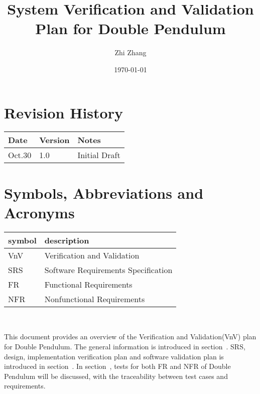 \documentclass[12pt, titlepage]{article}
\begin{document}
\title{System Verification and Validation Plan for Double Pendulum} 
\author{Zhi Zhang}
\date{\today}
	
\maketitle


\section{Revision History}

\begin{tabularx}{\textwidth}{p{3cm}p{2cm}X}
\toprule {\bf Date} & {\bf Version} & {\bf Notes}\\
\midrule
Oct.30 & 1.0 & Initial Draft\\

\bottomrule
\end{tabularx}

\newpage

\tableofcontents

\listoftables

\listoffigures

\newpage

\section{Symbols, Abbreviations and Acronyms}

\renewcommand{\arraystretch}{1.2}
\begin{tabular}{l l} 
  \toprule		
  \textbf{symbol} & \textbf{description}\\
  \midrule 
  VnV & Verification and Validation\\
  SRS & Software Requirements Specification\\
  FR & Functional Requirements\\
  NFR & Nonfunctional Requirements\\
  \bottomrule
\end{tabular}\\

\newpage


This document provides an overview of the Verification and Validation(VnV) plan for Double Pendulum. The general information is introduced in section~. SRS, design, implementation verification plan and software validation plan is introduced in section~. In section~, tests for both FR and NFR of Double Pendulum will be discussed, with the traceability between test cases and requirements. 
\end{document}
